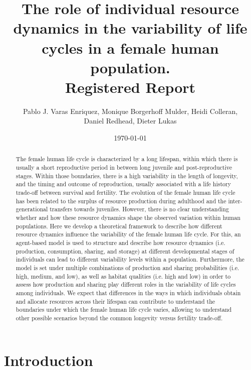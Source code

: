 \documentclass{article}
\title{The role of individual resource dynamics in the variability of life cycles in a female human population.
\\
Registered Report}
\author{Pablo J. Varas Enriquez, Monique Borgerhoff Mulder, Heidi Colleran,
\\
Daniel Redhead, Dieter Lukas}
\date{\today}
\begin{document}
\maketitle

\tableofcontents

\begin{abstract}
    The female human life cycle is characterized by a long lifespan, within which there is usually a short reproductive period in between long juvenile and post-reproductive stages. Within those boundaries, there is a high variability in the length of longevity, and the timing and outcome of reproduction, usually associated with a life history trade-off between survival and fertility. The evolution of the female human life cycle has been related to the surplus of resource production during adulthood and the inter-generational transfers towards juveniles. However, there is no clear understanding whether and how these resource dynamics shape the observed variation within human populations. Here we develop a theoretical framework to describe how different resource dynamics influence the variability of the female human life cycle. For this, an agent-based model is used to structure and describe how resource dynamics (i.e. production, consumption, sharing, and storage) at different developmental stages of individuals can lead to different variability levels within a population. Furthermore, the model is set under multiple combinations of production and sharing probabilities (i.e. high, medium, and low), as well as habitat qualities (i.e. high and low) in order to assess how production and sharing play different roles in the variability of life cycles among individuals. We expect that differences in the ways in which individuals obtain and allocate resources across their lifespan can contribute to understand the boundaries under which the female human life cycle varies, allowing to understand other possible scenarios beyond the common longevity versus fertility trade-off. 
\end{abstract}

\section{Introduction}
\end{document}
